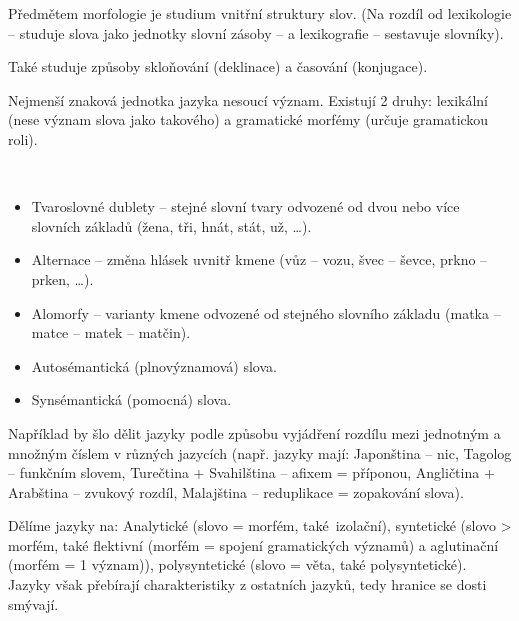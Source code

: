 \documentclass[12pt]{article}					%
\begin{document}
\begin{poznamka}
	Předmětem morfologie je studium vnitřní struktury slov. (Na rozdíl od lexikologie – studuje slova jako jednotky slovní zásoby – a lexikografie – sestavuje slovníky).

	Také studuje způsoby skloňování (deklinace) a časování (konjugace).
\end{poznamka}

\begin{definice}[Morfém]
	Nejmenší znaková jednotka jazyka nesoucí význam. Existují 2 druhy: lexikální (nese význam slova jako takového) a gramatické morfémy (určuje gramatickou roli).
\end{definice}

\begin{definice}
	\ 

	\vspace{-3.5em}

	\begin{itemize}
		\item Tvaroslovné dublety – stejné slovní tvary odvozené od dvou nebo více slovních základů (žena, tři, hnát, stát, už, …).
		\item Alternace – změna hlásek uvnitř kmene (vůz – vozu, švec – ševce, prkno – prken, …).
		\item Alomorfy – varianty kmene odvozené od stejného slovního základu (matka – matce – matek – matčin).
		\item Autosémantická (plnovýznamová) slova.
		\item Synsémantická (pomocná) slova.
	\end{itemize}
\end{definice}

\begin{poznamka}
	Například by šlo dělit jazyky podle způsobu vyjádření rozdílu mezi jednotným a množným číslem v různých jazycích (např. jazyky mají: Japonština – nic, Tagolog – funkčním slovem, Turečtina + Svahilština – afixem = příponou, Angličtina + Arabština – zvukový rozdíl, Malajština – reduplikace = zopakování slova).

	Dělíme jazyky na: Analytické (slovo = morfém, také izolační), syntetické (slovo > morfém, také flektivní (morfém = spojení gramatických významů) a aglutinační (morfém = 1 význam)), polysyntetické (slovo = věta, také polysyntetické). Jazyky však přebírají charakteristiky z ostatních jazyků, tedy hranice se dosti smývají.
\end{poznamka}
\end{document}

